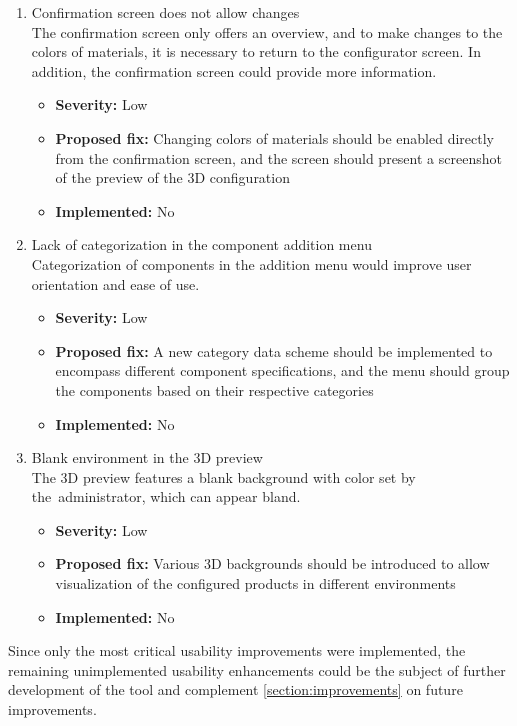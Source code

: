 \begin{enumerate}[label=\textbf{I\arabic*:}, leftmargin=27pt]
    \item Confirmation screen does not allow changes
        \vspace{2pt}
        \\The confirmation screen only offers an overview, and to make changes to the colors of materials, it is necessary to return to the configurator screen. In addition, the confirmation screen could provide more information.
        \begin{itemize}[noitemsep, label=\trianglebullet]
            \item \textbf{Severity:} Low
            \item \textbf{Proposed fix:} Changing colors of materials should be enabled directly from the confirmation screen, and the screen should present a screenshot of the preview of the 3D configuration
            \item \textbf{Implemented:} No
        \end{itemize}
        \vspace{4pt}

    \item Lack of categorization in the component addition menu
        \vspace{2pt}
        \\Categorization of components in the addition menu would improve user orientation and ease of use.
        \begin{itemize}[noitemsep, label=\trianglebullet]
            \item \textbf{Severity:} Low
            \item \textbf{Proposed fix:} A new category data scheme should be implemented to encompass different component specifications, and the menu should group the components based on their respective categories
            \item \textbf{Implemented:} No
        \end{itemize}
        \vspace{4pt}

    \item Blank environment in the 3D preview
        \vspace{2pt}
        \\The 3D preview features a blank background with color set by the~administrator, which can appear bland.
        \begin{itemize}[noitemsep, label=\trianglebullet]
            \item \textbf{Severity:} Low
            \item \textbf{Proposed fix:} Various 3D backgrounds should be introduced to allow visualization of the configured products in different environments
            \item \textbf{Implemented:} No
        \end{itemize}
        \vspace{4pt}
\end{enumerate}

Since only the most critical usability improvements were implemented, the remaining unimplemented usability enhancements could be the subject of further development of the tool and complement \autoref{section:improvements} on future improvements.
